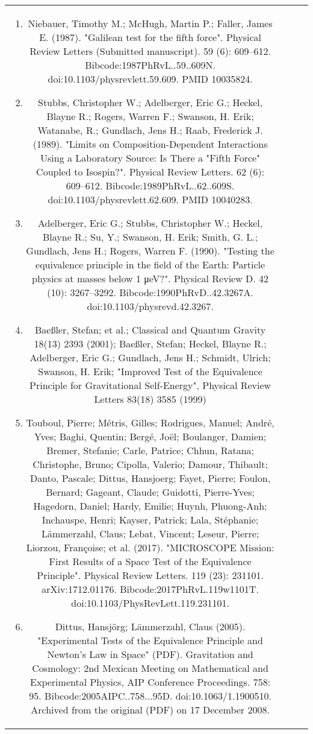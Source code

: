 \begin{table}[ht]
\begin{tabular}{|c|c|c|c}
\begin{enumerate}
\item Niebauer, Timothy M.; McHugh, Martin P.; Faller, James E. (1987). "Galilean test for the fifth force". Physical Review Letters (Submitted manuscript). 59 (6): 609–612. Bibcode:1987PhRvL..59..609N. doi:10.1103/physrevlett.59.609. PMID 10035824.
\item Stubbs, Christopher W.; Adelberger, Eric G.; Heckel, Blayne R.; Rogers, Warren F.; Swanson, H. Erik; Watanabe, R.; Gundlach, Jens H.; Raab, Frederick J. (1989). "Limits on Composition-Dependent Interactions Using a Laboratory Source: Is There a "Fifth Force" Coupled to Isospin?". Physical Review Letters. 62 (6): 609–612. Bibcode:1989PhRvL..62..609S. doi:10.1103/physrevlett.62.609. PMID 10040283.
\item Adelberger, Eric G.; Stubbs, Christopher W.; Heckel, Blayne R.; Su, Y.; Swanson, H. Erik; Smith, G. L.; Gundlach, Jens H.; Rogers, Warren F. (1990). "Testing the equivalence principle in the field of the Earth: Particle physics at masses below 1 μeV?". Physical Review D. 42 (10): 3267–3292. Bibcode:1990PhRvD..42.3267A. doi:10.1103/physrevd.42.3267.
\item Baeßler, Stefan; et al.; Classical and Quantum Gravity 18(13) 2393 (2001); Baeßler, Stefan; Heckel, Blayne R.; Adelberger, Eric G.; Gundlach, Jens H.; Schmidt, Ulrich; Swanson, H. Erik; "Improved Test of the Equivalence Principle for Gravitational Self-Energy", Physical Review Letters 83(18) 3585 (1999)
\item Touboul, Pierre; Métris, Gilles; Rodrigues, Manuel; André, Yves; Baghi, Quentin; Bergé, Joël; Boulanger, Damien; Bremer, Stefanie; Carle, Patrice; Chhun, Ratana; Christophe, Bruno; Cipolla, Valerio; Damour, Thibault; Danto, Pascale; Dittus, Hansjoerg; Fayet, Pierre; Foulon, Bernard; Gageant, Claude; Guidotti, Pierre-Yves; Hagedorn, Daniel; Hardy, Emilie; Huynh, Phuong-Anh; Inchauspe, Henri; Kayser, Patrick; Lala, Stéphanie; Lämmerzahl, Claus; Lebat, Vincent; Leseur, Pierre; Liorzou, Françoise; et al. (2017). "MICROSCOPE Mission: First Results of a Space Test of the Equivalence Principle". Physical Review Letters. 119 (23): 231101. arXiv:1712.01176. Bibcode:2017PhRvL.119w1101T. doi:10.1103/PhysRevLett.119.231101.
\item Dittus, Hansjörg; Lāmmerzahl, Claus (2005). "Experimental Tests of the Equivalence Principle and Newton's Law in Space" (PDF). Gravitation and Cosmology: 2nd Mexican Meeting on Mathematical and Experimental Physics, AIP Conference Proceedings. 758: 95. Bibcode:2005AIPC..758...95D. doi:10.1063/1.1900510. Archived from the original (PDF) on 17 December 2008.

\end{enumerate}
\end{tabular}
\end{table}
